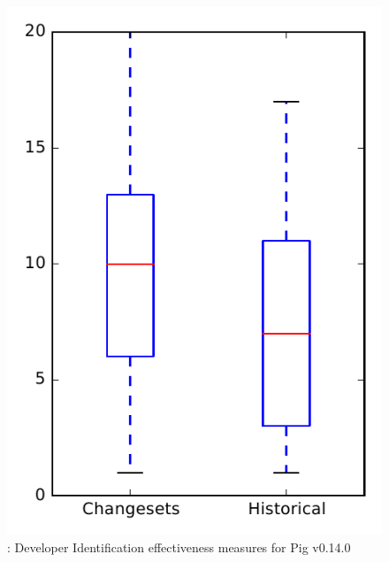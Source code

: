 
\begin{figure}
\centering
\includegraphics[height=0.4\textheight]{figures/dit/rq2_pig_no_outlier}
\caption{\dtwo: Developer Identification effectiveness measures for Pig v0.14.0}
\label{fig:dit:rq2:pig}
\end{figure}
